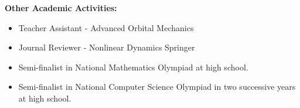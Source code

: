 \documentclass[11pt,a4paper, sans]{moderncv}
\begin{document}
	\textbf{Other Academic Activities:}
	\begin{itemize}
		\item Teacher Assistant - Advanced Orbital Mechanics 
		\item Journal Reviewer - Nonlinear Dynamics Springer
		\item Semi-finalist in National Mathematics Olympiad at high school.
		\item Semi-finalist in National Computer Science Olympiad in two successive years at high school.
	\end{itemize}


\end{document}
